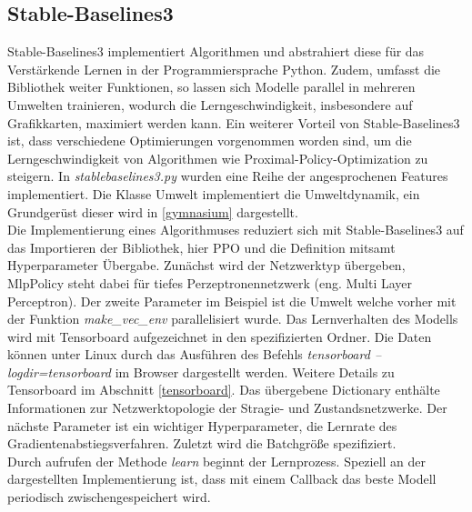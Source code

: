 \subsection{Stable-Baselines3}
Stable-Baselines3 implementiert Algorithmen und abstrahiert diese für das Verstärkende Lernen in der Programmiersprache Python. \label{paralleleUmwelten}Zudem, umfasst die Bibliothek weiter Funktionen, so lassen sich Modelle parallel in mehreren Umwelten trainieren, wodurch die Lerngeschwindigkeit, insbesondere auf Grafikkarten, maximiert werden kann. Ein weiterer Vorteil von Stable-Baselines3 ist, dass verschiedene Optimierungen vorgenommen worden sind, um die Lerngeschwindigkeit von Algorithmen wie Proximal-Policy-Optimization zu steigern. In \textit{stablebaselines3.py} wurden eine Reihe der angesprochenen Features implementiert. Die Klasse Umwelt implementiert die Umweltdynamik, ein Grundgerüst dieser wird in \ref{gymnasium} dargestellt.\\
Die Implementierung eines Algorithmuses reduziert sich mit Stable-Baselines3 auf das Importieren der Bibliothek, hier PPO und die Definition mitsamt Hyperparameter Übergabe. Zunächst wird der Netzwerktyp übergeben, MlpPolicy steht dabei für tiefes Perzeptronennetzwerk (eng. Multi Layer Perceptron). Der zweite Parameter im Beispiel ist die Umwelt welche vorher mit der Funktion \textit{make\_vec\_env} parallelisiert wurde. Das Lernverhalten des Modells wird mit Tensorboard aufgezeichnet in den spezifizierten Ordner. Die Daten können unter Linux durch das Ausführen des Befehls \textit{tensorboard --logdir=tensorboard} im Browser dargestellt werden. Weitere Details zu Tensorboard im Abschnitt \ref{tensorboard}. Das übergebene Dictionary enthälte Informationen zur Netzwerktopologie der Stragie- und Zustandsnetzwerke. Der nächste Parameter ist ein wichtiger Hyperparameter, die Lernrate des Gradientenabstiegsverfahren. Zuletzt wird die Batchgröße spezifiziert.\\
Durch aufrufen der Methode \textit{learn} beginnt der Lernprozess. Speziell an der dargestellten Implementierung ist, dass mit einem Callback das beste Modell periodisch zwischengespeichert wird. 
